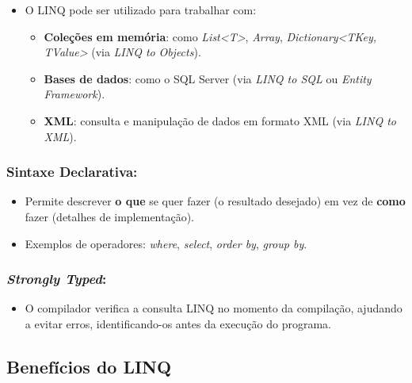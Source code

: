 \documentclass[
]{article}
\begin{document}
\begin{itemize}
\item
  O LINQ pode ser utilizado para trabalhar com:

  \begin{itemize}
  \item
    \textbf{Coleções em memória}: como
    \emph{List\textless T\textgreater{}}, \emph{Array},
    \emph{Dictionary\textless TKey, TValue\textgreater{}} (via
    \emph{LINQ to} \emph{Objects}).
  \item
    \textbf{Bases de dados}: como o SQL Server (via \emph{LINQ to SQL}
    ou \emph{Entity Framework}).
  \item
    \textbf{XML}: consulta e manipulação de dados em formato XML (via
    \emph{LINQ to XML}).
  \end{itemize}
\end{itemize}

\hypertarget{sintaxe-declarativa}{%
\subsubsection{Sintaxe Declarativa:}\label{sintaxe-declarativa}}

\begin{itemize}
\item
  Permite descrever \textbf{o que} se quer fazer (o resultado desejado)
  em vez de \textbf{como} fazer (detalhes de implementação).
\item
  Exemplos de operadores: \emph{where}, \emph{select}, \emph{order by},
  \emph{group by}.
\end{itemize}

\hypertarget{strongly-typed}{%
\subsubsection{\texorpdfstring{\emph{Strongly
Typed}:}{Strongly Typed:}}\label{strongly-typed}}

\begin{itemize}
\item
  O compilador verifica a consulta LINQ no momento da compilação,
  ajudando a evitar erros, identificando-os antes da execução do
  programa.
\end{itemize}

\hypertarget{benefuxedcios-do-linq}{%
\subsection{Benefícios do LINQ}\label{benefuxedcios-do-linq}}
\end{document}
